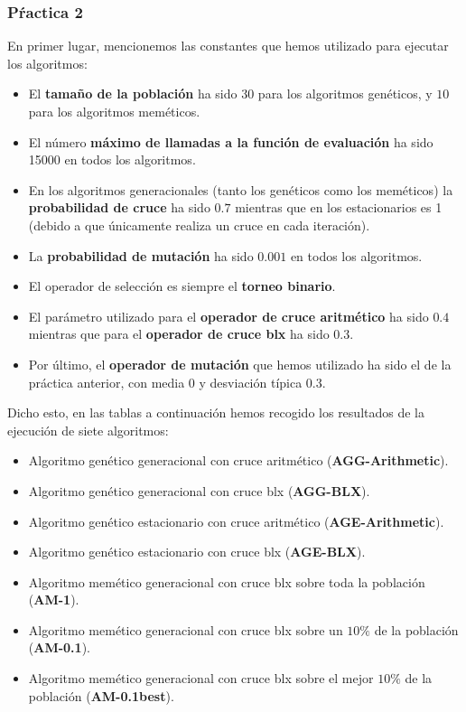 \documentclass[size=a4, parskip=half, titlepage=false, toc=flat, toc=bib, 12pt]{scrartcl}
\begin{document}
\subsubsection{Pŕactica 2}
En primer lugar, mencionemos las constantes que hemos utilizado para ejecutar los algoritmos:
\begin{itemize}
    \item El \textbf{tamaño de la población} ha sido $30$ para los algoritmos genéticos, y $10$ para los algoritmos meméticos.
    \item El número \textbf{máximo de llamadas a la función de evaluación} ha sido 15000 en todos los algoritmos.
    \item En los algoritmos generacionales (tanto los genéticos como los meméticos) la \textbf{probabilidad de cruce} ha sido $0.7$ mientras que en los estacionarios es 1 (debido a que únicamente realiza un cruce en cada iteración).
    \item La \textbf{probabilidad de mutación} ha sido $0.001$ en todos los algoritmos.
    \item El operador de selección es siempre el \textbf{torneo binario}.
    \item El parámetro utilizado para el \textbf{operador de cruce aritmético} ha sido $0.4$ mientras que para el \textbf{operador de cruce blx} ha sido $0.3$.
    \item Por último, el \textbf{operador de mutación} que hemos utilizado ha sido el de la práctica anterior, con media $0$ y desviación típica  $0.3$.
\end{itemize}

Dicho esto, en las tablas a continuación hemos recogido los resultados de la ejecución de siete algoritmos:
\begin{itemize}
    \item Algoritmo genético generacional con cruce aritmético (\textbf{AGG-Arithmetic}).
    \item Algoritmo genético generacional con cruce blx (\textbf{AGG-BLX}).
    \item Algoritmo genético estacionario con cruce aritmético (\textbf{AGE-Arithmetic}).
    \item Algoritmo genético estacionario con cruce blx (\textbf{AGE-BLX}).
    \item Algoritmo memético generacional con cruce blx sobre toda la población (\textbf{AM-1}).
    \item Algoritmo memético generacional con cruce blx sobre un $10\%$ de la población (\textbf{AM-0.1}).
    \item Algoritmo memético generacional con cruce blx sobre el mejor $10\%$ de la población (\textbf{AM-0.1best}).

\end{itemize}
\end{document}
